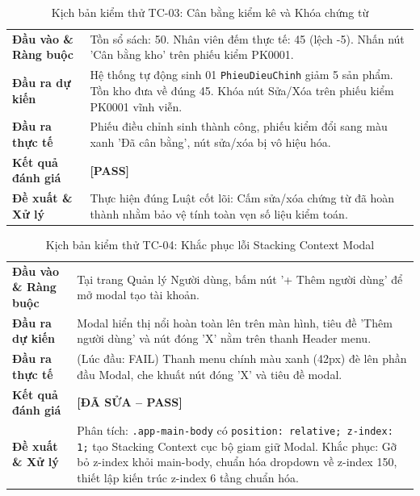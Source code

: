 \documentclass[12pt,a4paper]{report}
\renewcommand{\_}{\textunderscore\allowbreak}
\begin{document}
\begin{table}[H]
\centering
\small
\renewcommand{\arraystretch}{1.25}
\begin{tabularx}{\textwidth}{|p{3.8cm}|Y|}
\hline
{}
 \\
\hline
\textbf{Đầu vào \& Ràng buộc} & Tồn sổ sách: 50. Nhân viên đếm thực tế: 45 (lệch -5). Nhấn nút 'Cân bằng kho' trên phiếu kiểm PK0001. \\
\hline
\textbf{Đầu ra dự kiến} & Hệ thống tự động sinh 01 \texttt{PhieuDieuChinh} giảm 5 sản phẩm. Tồn kho đưa về đúng 45. Khóa nút Sửa/Xóa trên phiếu kiểm PK0001 vĩnh viễn. \\
\hline
\textbf{Đầu ra thực tế} & Phiếu điều chỉnh sinh thành công, phiếu kiểm đổi sang màu xanh 'Đã cân bằng', nút sửa/xóa bị vô hiệu hóa. \\
\hline
\textbf{Kết quả đánh giá} & \textbf{[PASS]} \\
\hline
\textbf{Đề xuất \& Xử lý} & Thực hiện đúng Luật cốt lõi: Cấm sửa/xóa chứng từ đã hoàn thành nhằm bảo vệ tính toàn vẹn số liệu kiểm toán. \\
\hline
\end{tabularx}
\caption{Kịch bản kiểm thử TC-03: Cân bằng kiểm kê và Khóa chứng từ}
\label{tab:tc3}
\end{table}

\begin{table}[H]
\centering
\small
\renewcommand{\arraystretch}{1.25}
\begin{tabularx}{\textwidth}{|p{3.8cm}|Y|}
\hline
{}
 \\
\hline
\textbf{Đầu vào \& Ràng buộc} & Tại trang Quản lý Người dùng, bấm nút '+ Thêm người dùng' để mở modal tạo tài khoản. \\
\hline
\textbf{Đầu ra dự kiến} & Modal hiển thị nổi hoàn toàn lên trên màn hình, tiêu đề 'Thêm người dùng' và nút đóng 'X' nằm trên thanh Header menu. \\
\hline
\textbf{Đầu ra thực tế} & (Lúc đầu: FAIL) Thanh menu chính màu xanh (42px) đè lên phần đầu Modal, che khuất nút đóng 'X' và tiêu đề modal. \\
\hline
\textbf{Kết quả đánh giá} & \textbf{[ĐÃ SỬA -- PASS]} \\
\hline
\textbf{Đề xuất \& Xử lý} & Phân tích: \texttt{.app-main-body} có \texttt{position: relative; z-index: 1;} tạo Stacking Context cục bộ giam giữ Modal. Khắc phục: Gỡ bỏ z-index khỏi main-body, chuẩn hóa dropdown về z-index 150, thiết lập kiến trúc z-index 6 tầng chuẩn hóa. \\
\hline
\end{tabularx}
\caption{Kịch bản kiểm thử TC-04: Khắc phục lỗi Stacking Context Modal}
\label{tab:tc4}
\end{table}
\end{document}
